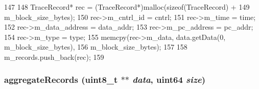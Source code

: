 \begin{DoxyCode}
147 {
148     TraceRecord* rec = (TraceRecord*)malloc(sizeof(TraceRecord) +
149                                             m_block_size_bytes);
150     rec->m_cntrl_id     = cntrl;
151     rec->m_time         = time;
152     rec->m_data_address = data_addr;
153     rec->m_pc_address   = pc_addr;
154     rec->m_type         = type;
155     memcpy(rec->m_data, data.getData(0, m_block_size_bytes),
156            m_block_size_bytes);
157 
158     m_records.push_back(rec);
159 }
\end{DoxyCode}
\hypertarget{classCacheRecorder_a6ae226d7f41b789f69be6b38862f9f60}{
\subsubsection[{aggregateRecords}]{ aggregateRecords (uint8\_\-t $\ast$$\ast$ {\em data}, \/  {\bf uint64} {\em size})}}
\label{classCacheRecorder_a6ae226d7f41b789f69be6b38862f9f60}



